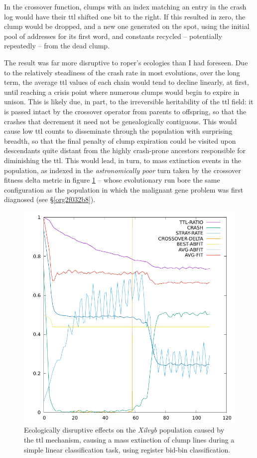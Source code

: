\documentclass[12pt,glossary]{dalthesis}
\begin{document}
In the crossover function, clumps with an index matching an entry in the crash log
would have their \gls{ttl} shifted one bit to the right. If this resulted in zero, the
clump would be dropped, and a new one generated on the spot, using the initial pool
of addresses for its first word, and constants recycled -- potentially repeatedly -- from
the dead clump. 

The result was far more disruptive to \gls{roper}'s ecologies than I had foreseen. 
Due to the relatively steadiness of the crash rate in most evolutions, over the
long term, the average \gls{ttl} values of each chain would tend to decline 
linearly, at first, until reaching a crisis point where numerous clumps would begin
to expire in unison. 
This is likely due, in part, to the irreversible heritability
of the \gls{ttl} field: it is passed intact by the crossover operator from parents to 
offspring, so that the crashes that decrement it need not be genealogically
contiguous. This would cause low \gls{ttl} counts to disseminate through the
population with surprising breadth, so that the final penalty of clump expiration
could be visited upon descendants quite distant from the highly crash-prone
ancestors responsible for diminishing the \gls{ttl}. 
This would lead, in turn, to mass extinction events in the population, as indexed in
the \emph{astronomically poor} turn taken by the crossover fitness delta metric in 
figure \ref{fig:org3be4f80} -- whose evolutionary run bore the same configuration as the population
in which the malignant gene problem was first diagnosed (see \S \ref{org2f032b8}).  

\begin{figure}[htbp]
\centering
\includegraphics[width=.9\linewidth]{../images/plots/xilvyb.pdf}
\caption{\label{fig:org3be4f80}
Ecologically disruptive effects on the \emph{Xilvyb} population caused by the \gls{ttl} mechanism, causing a mass extinction of clump lines during a simple linear classification task, using register bid-bin classification.}
\end{figure}
\end{document}

